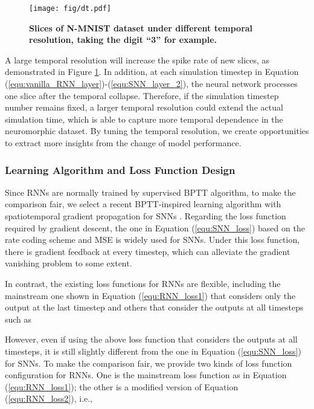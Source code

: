 \documentclass[journal,10pt,twocolumn]{IEEETran}
\begin{document}
\begin{figure}[!htbp]
\centering     
\texttt{[image: fig/dt.pdf]}
\caption{\textbf{Slices of N-MNIST dataset under different temporal resolution, taking the digit ``3'' for example.}}
\label{fig:NMNIST_dt} 
\end{figure}

A large temporal resolution will increase the spike rate of new slices, as demonstrated in Figure \ref{fig:NMNIST_dt}. In addition, at each simulation timestep in Equation (\ref{equ:vanilla_RNN_layer})-(\ref{equ:SNN_layer_2}), the neural network processes one slice after the temporal collapse. Therefore, if the simulation timestep number  remains fixed, a larger temporal resolution could extend the actual simulation time, which is able to capture more temporal dependence in the neuromorphic dataset. By tuning the temporal resolution, we create opportunities to extract more insights from the change of model performance.

\bigskip
\subsubsection{Learning Algorithm and Loss Function Design}\quad

Since RNNs are normally trained by supervised BPTT algorithm, to make the comparison fair, we select a recent BPTT-inspired learning algorithm with spatiotemporal gradient propagation for SNNs \cite{wu2018spatio}. Regarding the loss function required by gradient descent, the one in Equation (\ref{equ:SNN_loss}) based on the rate coding scheme and MSE is widely used for SNNs. Under this loss function, there is gradient feedback at every timestep, which can alleviate the gradient vanishing problem to some extent.


In contrast, the existing loss functions for RNNs are flexible, including the mainstream one shown in Equation (\ref{equ:RNN_loss1}) that considers only the output at the last timestep and others that consider the outputs at all timesteps \cite{werbos1990backpropagation,boden2002guide,vlachas2020backpropagation} such as 

However, even if using the above loss function that considers the outputs at all timesteps, it is still slightly different from the one in Equation (\ref{equ:SNN_loss}) for SNNs. To make the comparison fair, we provide two kinds of loss function configuration for RNNs. One is the mainstream loss function as in Equation (\ref{equ:RNN_loss1}); the other is a modified version of Equation (\ref{equ:RNN_loss2}), i.e.,
\end{document}

